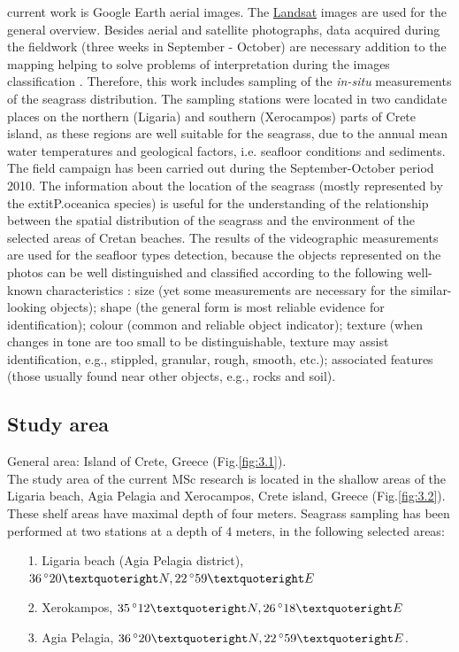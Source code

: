 \documentclass[11pt]{article}
\begin{document}
current work is Google Earth aerial images. The  \href{http://landsat.gsfc.nasa.gov/}{Landsat} images are used for the general overview.
Besides aerial and satellite photographs, data acquired during the fieldwork (three weeks in September - October) are
necessary addition to the mapping helping to solve problems of interpretation during the images
classification \cite{Pasqualini98a}\label{Pasqualini98a}. Therefore, this work includes sampling of the \textit{in-situ}
measurements of the seagrass distribution.
The sampling stations were located in two candidate places on the northern (Ligaria) and southern
(Xerocampos) parts of Crete island, as these regions are well suitable for the seagrass, due to the
annual mean water temperatures and geological factors, i.e. seafloor conditions and sediments. \\ The
field campaign has been carried out during the September-October period 2010. 
The information about the location of the seagrass (mostly represented by the 	extit{P.oceanica} species) is useful for the
understanding of the relationship between the spatial distribution of the seagrass and the environment
of the selected areas of Cretan beaches. The results of the videographic measurements are used for the
seafloor types detection, because the objects represented on the photos can be well distinguished and
classified according to the following well-known characteristics \cite{Butler87}\label{Butler87}: size (yet some
measurements are necessary for the similar-looking objects); shape (the general form is most reliable
evidence for identification); colour (common and reliable object indicator); texture (when changes in
tone are too small to be distinguishable, texture may assist identification, e.g., stippled, granular,
rough, smooth, etc.); associated features (those usually found near other objects, e.g., rocks and soil).

\subsection{Study area}
General area: Island of Crete, Greece (Fig.\ref{fig:3.1})\label{page-23}.\\
The study area of the current MSc research is located in the shallow areas of the Ligaria beach, Agia
Pelagia and Xerocampos, Crete island, Greece (Fig.\ref{fig:3.2}). These shelf areas have maximal depth of four meters.
Seagrass sampling has been performed at two stations at a depth of 4 meters, in the following selected
areas:
\begin{itemize}
	\item [1.] Ligaria beach (Agia Pelagia district), $36\,^{\circ}20\textquoteright N, 22\,^{\circ}59\textquoteright E$ 
	\item [2.] Xerokampos, $35\,^{\circ}12\textquoteright N, 26\,^{\circ}18\textquoteright E$
	\item [3.] Agia Pelagia, $36\,^{\circ}20\textquoteright N, 22\,^{\circ}59\textquoteright E$.
\end{itemize}
\end{document}
